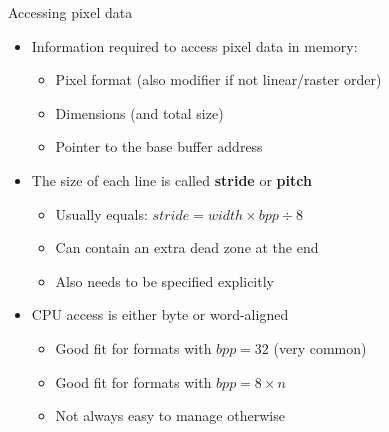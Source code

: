 \begin{frame}{Accessing pixel data}
  \begin{itemize}
  \item Information required to access pixel data in memory:
    \begin{itemize}
    \item Pixel format (also modifier if not linear/raster order)
    \item Dimensions (and total size)
    \item Pointer to the base buffer address
    \end{itemize}
  \item The size of each line is called \textbf{stride} or \textbf{pitch}
    \begin{itemize}
    \item Usually equals: \(stride = width \times bpp \div 8\)
    \item Can contain an extra dead zone at the end
    \item Also needs to be specified explicitly
    \end{itemize}
  \item CPU access is either byte or word-aligned
    \begin{itemize}
    \item Good fit for formats with \(bpp = 32\) (very common)
    \item Good fit for formats with \(bpp = 8 \times n\)
    \item Not always easy to manage otherwise
    \end{itemize}
  \end{itemize}
\end{frame}

